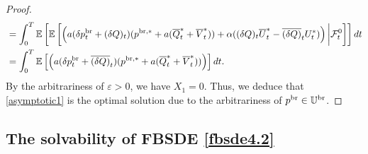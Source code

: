 \documentclass[11pt]{article}
\numberwithin{equation}{section}
\begin{document}
\begin{proof}
\begin{align*}
&=\int_0^T\mathbb{E}\left[\mathbb{E}\left[\left(a(\delta p_t^{{\rm br}}+(\delta Q)_t)(p^{{\rm br},*}+a( \overline{Q}_t^*+ \overline{V}_t^*))+\alpha ((\delta Q)_t\overline{U}_t^*- \overline{(\delta Q)}_tU_t^*)\right)\bigg|\mathcal{F}_t^0\right]\right]dt\\
&=\int_0^T\mathbb{E}\left[\left(a(\delta p_t^{{\rm br}}+\overline{(\delta Q)}_t)(p^{{\rm br},*}+a( \overline{Q}_t^*+ \overline{V}_t^*))\right)\right]dt.
\end{align*}
By the arbitrariness of $\varepsilon>0$, we have $X_1=0$. Thus, we deduce that \eqref{asymptotic1} is the optimal solution due to the arbitrariness of $p^{{\rm br}}\in\mathbb{U}^{\rm br}$.
\end{proof}

\subsection{The solvability of FBSDE \eqref{fbsde4.2}}
\end{document}
